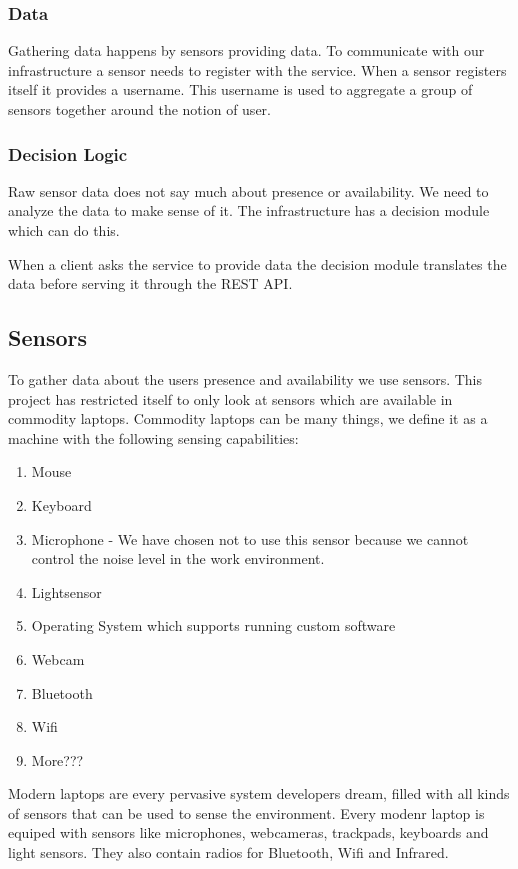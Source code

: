 \documentclass{sigchi}
\begin{document}
\subsubsection{Data}
Gathering data happens by sensors providing data.
To communicate with our infrastructure a sensor needs to register with the service.
When a sensor registers itself it provides a username.
This username is used to aggregate a group of sensors together around the notion of user.

\subsubsection{Decision Logic}
Raw sensor data does not say much about presence or availability.
We need to analyze the data to make sense of it.
The infrastructure has a decision module which can do this.

When a client asks the service to provide data the decision module translates the data before serving it through the REST API.

\subsection{Sensors}
To gather data about the users presence and availability we use sensors.
This project has restricted itself to only look at sensors which are available in commodity laptops.
Commodity laptops can be many things, we define it as a machine with the following sensing capabilities:
\begin{enumerate}
  \item Mouse
  \item Keyboard
  \item Microphone - We have chosen not to use this sensor because we cannot control the noise level in the work environment.
  \item Lightsensor
  \item Operating System which supports running custom software
  \item Webcam
  \item Bluetooth
  \item Wifi
  \item More???
\end{enumerate}

Modern laptops are every pervasive system developers dream, filled with all kinds of sensors that can be used to sense the environment.
Every modenr laptop is equiped with sensors like microphones, webcameras, trackpads, keyboards and light sensors.
They also contain radios for Bluetooth, Wifi and Infrared.
\end{document}
